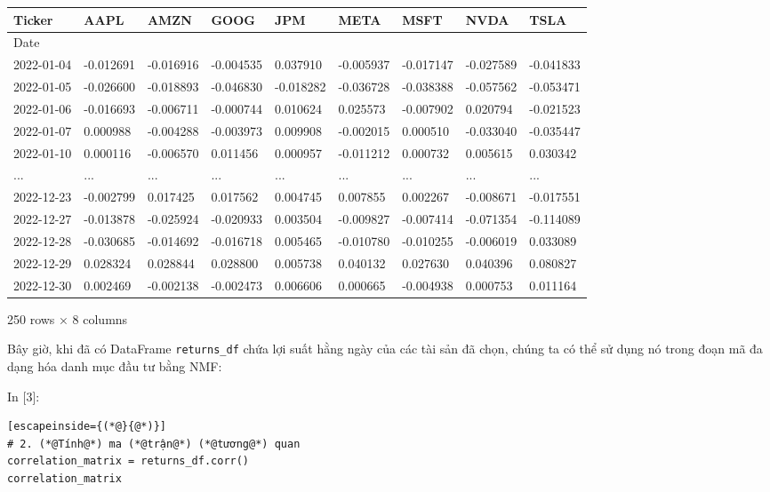 {\small
\begin{longtable}[]{@{}lllllllll@{}}
\toprule\noalign{}
Ticker & AAPL & AMZN & GOOG & JPM & META & MSFT & NVDA & TSLA \\
\midrule\noalign{}
\endhead
\bottomrule\noalign{}
\endlastfoot
Date & & & & & & & & \\
2022-01-04 & -0.012691 & -0.016916 & -0.004535 & 0.037910 & -0.005937 & -0.017147 & -0.027589 & -0.041833 \\
2022-01-05 & -0.026600 & -0.018893 & -0.046830 & -0.018282 & -0.036728 & -0.038388 & -0.057562 & -0.053471 \\
2022-01-06 & -0.016693 & -0.006711 & -0.000744 & 0.010624 & 0.025573 & -0.007902 & 0.020794 & -0.021523 \\
2022-01-07 & 0.000988 & -0.004288 & -0.003973 & 0.009908 & -0.002015 & 0.000510 & -0.033040 & -0.035447 \\
2022-01-10 & 0.000116 & -0.006570 & 0.011456 & 0.000957 & -0.011212 & 0.000732 & 0.005615 & 0.030342 \\
... & ... & ... & ... & ... & ... & ... & ... & ... \\
2022-12-23 & -0.002799 & 0.017425 & 0.017562 & 0.004745 & 0.007855 & 0.002267 & -0.008671 & -0.017551 \\
2022-12-27 & -0.013878 & -0.025924 & -0.020933 & 0.003504 & -0.009827 & -0.007414 & -0.071354 & -0.114089 \\
2022-12-28 & -0.030685 & -0.014692 & -0.016718 & 0.005465 & -0.010780 & -0.010255 & -0.006019 & 0.033089 \\
2022-12-29 & 0.028324 & 0.028844 & 0.028800 & 0.005738 & 0.040132 & 0.027630 & 0.040396 & 0.080827 \\
2022-12-30 & 0.002469 & -0.002138 & -0.002473 & 0.006606 & 0.000665 & -0.004938 & 0.000753 & 0.011164 \\
\end{longtable}
}

250 rows × 8 columns

Bây giờ, khi đã có DataFrame \texttt{returns\_df} chứa lợi suất hằng ngày của các tài sản đã chọn, chúng ta có thể sử dụng nó trong đoạn mã đa dạng hóa danh mục đầu tư bằng NMF:

In {[}3{]}:

\begin{lstlisting}[escapeinside={(*@}{@*)}]
# 2. (*@Tính@*) ma (*@trận@*) (*@tương@*) quan
correlation_matrix = returns_df.corr()
correlation_matrix
\end{lstlisting}

